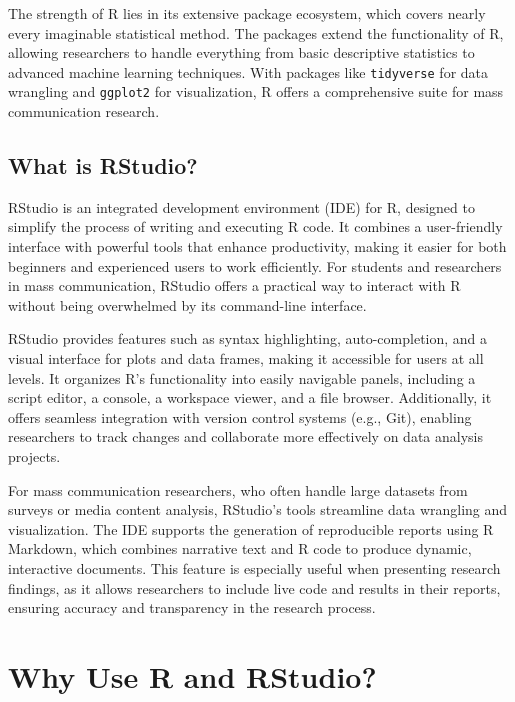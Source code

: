 \documentclass[
]{book}
\begin{document}
The strength of R lies in its extensive package ecosystem, which covers nearly every imaginable statistical method. The packages extend the functionality of R, allowing researchers to handle everything from basic descriptive statistics to advanced machine learning techniques. With packages like \texttt{tidyverse} for data wrangling and \texttt{ggplot2} for visualization, R offers a comprehensive suite for mass communication research.

\subsection*{What is RStudio?}\label{what-is-rstudio}

RStudio is an integrated development environment (IDE) for R, designed to simplify the process of writing and executing R code. It combines a user-friendly interface with powerful tools that enhance productivity, making it easier for both beginners and experienced users to work efficiently. For students and researchers in mass communication, RStudio offers a practical way to interact with R without being overwhelmed by its command-line interface.

RStudio provides features such as syntax highlighting, auto-completion, and a visual interface for plots and data frames, making it accessible for users at all levels. It organizes R's functionality into easily navigable panels, including a script editor, a console, a workspace viewer, and a file browser. Additionally, it offers seamless integration with version control systems (e.g., Git), enabling researchers to track changes and collaborate more effectively on data analysis projects.

For mass communication researchers, who often handle large datasets from surveys or media content analysis, RStudio's tools streamline data wrangling and visualization. The IDE supports the generation of reproducible reports using R Markdown, which combines narrative text and R code to produce dynamic, interactive documents. This feature is especially useful when presenting research findings, as it allows researchers to include live code and results in their reports, ensuring accuracy and transparency in the research process.

\section{Why Use R and RStudio?}\label{why-use-r-and-rstudio}
\end{document}
